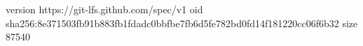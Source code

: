 version https://git-lfs.github.com/spec/v1
oid sha256:8e371503fb91b883fb1fdadc0bbfbe7fb6d5fe782bd0fd14f181220cc06f6b32
size 87540
